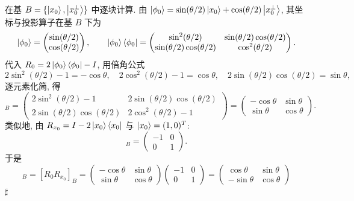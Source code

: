 \documentclass[utf8]{article} %
\numberwithin{equation}{section}   %
\newenvironment{Proof}[1][\relax]{{\noindent\it Proof\ifx\relax#1\relax\else\ (#1)\fi:}\quad}{\hfill $\sharp$\par}
\begin{document}
\begin{Proof}
    在基 $B = \{\ket{x_0}, \ket{x_0^\perp}\}$ 中逐块计算. 由
    $\ket{\phi_0} = \sin(\theta/2)\ket{x_0} + \cos(\theta/2)\ket{x_0^\perp}$,
    其坐标与投影算子在基 $B$ 下为
    \[ \ket{\phi_0} = \begin{pmatrix} \sin(\theta/2) \\ \cos(\theta/2) \end{pmatrix}, \qquad
       \ket{\phi_0}\bra{\phi_0} = \begin{pmatrix} \sin^2(\theta/2) & \sin(\theta/2)\cos(\theta/2) \\
       \sin(\theta/2)\cos(\theta/2) & \cos^2(\theta/2) \end{pmatrix}. \]
    代入 $R_0 = 2\ket{\phi_0}\bra{\phi_0} - I$, 用倍角公式
    \[ 2\sin^2(\theta/2) - 1 = -\cos\theta, \quad
       2\cos^2(\theta/2) - 1 = \cos\theta, \quad
       2\sin(\theta/2)\cos(\theta/2) = \sin\theta, \]
    逐元素化简, 得
    \begin{equation}
        [R_0]_B = \begin{pmatrix} 2\sin^2(\theta/2) - 1 & 2\sin(\theta/2)\cos(\theta/2) \\
        2\sin(\theta/2)\cos(\theta/2) & 2\cos^2(\theta/2) - 1 \end{pmatrix}
        = \begin{pmatrix} -\cos\theta & \sin\theta \\ \sin\theta & \cos\theta \end{pmatrix}.
    \end{equation}
    类似地, 由 $R_{x_0} = I - 2\ket{x_0}\bra{x_0}$ 与 $\ket{x_0} = (1, 0)^T$:
    \begin{equation}
        [R_{x_0}]_B = \begin{pmatrix} -1 & 0 \\ 0 & 1 \end{pmatrix}.
    \end{equation}
    于是
    \begin{equation}
        [G]_B = [R_0R_{x_0}]_B
        = \begin{pmatrix} -\cos\theta & \sin\theta \\ \sin\theta & \cos\theta \end{pmatrix}
        \begin{pmatrix} -1 & 0 \\ 0 & 1 \end{pmatrix}
        = \begin{pmatrix} \cos\theta & \sin\theta \\ -\sin\theta & \cos\theta \end{pmatrix}

\end{equation}
\end{Proof}
\end{document}
